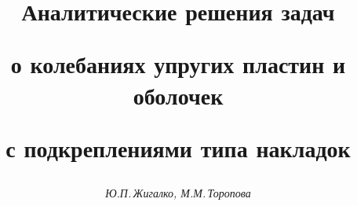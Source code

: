 









\newcommand{\ctg}{\operatorname{ctg}}


\newcommand{\tg}{\operatorname{tg}}


\newcommand{\cth}{\operatorname{cth}}


\newcommand{\sh}{\operatorname{sh}}


\newcommand{\ch}{\operatorname{ch}}


\newcommand{\res}{\operatorname{res}}


\newcommand{\tts}[1]{}







 


\setcounter{page}{47}












\author{\it Ю.П.\,Жигалко, М.М.\,Торопова}




\title{Аналитические решения задач


о колебаниях упругих пластин и оболочек


с подкреплениями типа накладок}





\date{}








